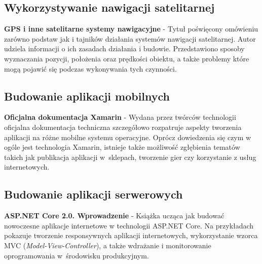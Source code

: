\subsection{Wykorzystywanie nawigacji satelitarnej}
\textbf{GPS i inne satelitarne systemy nawigacyjne} \cite{gps2} - Tytuł poświęcony omówieniu zarówno podstaw jak i tajników działania systemów nawigacji satelitarnej. Autor udziela informacji o ich zasadach działania i budowie. Przedstawiono sposoby wyznaczania pozycji, położenia oraz prędkości obiektu, a także problemy które mogą pojawić się podczas wykonywania tych czynności.
\subsection{Budowanie aplikacji mobilnych}
\textbf{Oficjalna dokumentacja Xamarin} \cite{xamarin_docs_real} - Wydana przez twórców technologii oficjalna dokumentacja techniczna szczegółowo rozpatruje aspekty tworzenia aplikacji na różne mobilne systemu operacyjne. Oprócz dowiedzenia się czym w ogóle jest technologia Xamarin, istnieje także możliwość zgłębienia tematów takich jak publikacja aplikacji w~sklepach, tworzenie gier czy korzystanie z usług internetowych.
\subsection{Budowanie aplikacji serwerowych}
\textbf{ASP.NET Core 2.0. Wprowadzenie} \cite{ksiazka-asp-core} - Książka ucząca jak budować nowoczesne aplikacje internetowe w technologii ASP.NET Core. Na przykładach pokazuje tworzenie responsywnych aplikacji internetowych, wykorzystanie wzorca MVC (\textit{Model-View-Controller}), a także wdrażanie i monitorowanie oprogramowania w~środowisku produkcyjnym.

